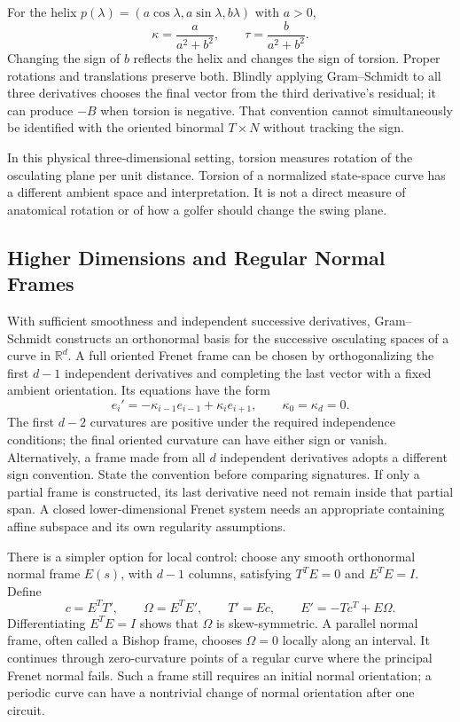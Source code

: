 For the helix $p(\lambda)=(a\cos\lambda,a\sin\lambda,b\lambda)$ with $a>0$,
\begin{equation}
 \kappa=\frac{a}{a^2+b^2},\qquad \tau=\frac{b}{a^2+b^2}.
\end{equation}
Changing the sign of $b$ reflects the helix and changes the sign of torsion.
Proper rotations and translations preserve both. Blindly applying
Gram--Schmidt to all three derivatives chooses the final vector from the
third derivative's residual; it can produce $-B$ when torsion is negative.
That convention cannot simultaneously be identified with the oriented
binormal $T\times N$ without tracking the sign.

In this physical three-dimensional setting, torsion measures rotation of the
osculating plane per unit distance. Torsion of a normalized state-space curve
has a different ambient space and interpretation. It is not a direct measure
of anatomical rotation or of how a golfer should change the swing plane.

\subsection{Higher Dimensions and Regular Normal Frames}

With sufficient smoothness and independent successive derivatives,
Gram--Schmidt constructs an orthonormal basis for the successive osculating
spaces of a curve in $\mathbb R^d$. A full oriented Frenet frame can be chosen
by orthogonalizing the first $d-1$ independent derivatives and completing the
last vector with a fixed ambient orientation. Its equations have the form
\begin{equation}
 e_i'=-\kappa_{i-1}e_{i-1}+\kappa_i e_{i+1},
 \qquad \kappa_0=\kappa_d=0.
\end{equation}
The first $d-2$ curvatures are positive under the required independence
conditions; the final oriented curvature can have either sign or vanish.
Alternatively, a frame made from all $d$ independent derivatives adopts a
different sign convention. State the convention before comparing signatures.
If only a partial frame is constructed, its last derivative need not remain
inside that partial span. A closed lower-dimensional Frenet system needs an
appropriate containing affine subspace and its own regularity assumptions.

There is a simpler option for local control: choose any smooth orthonormal
normal frame $E(s)$, with $d-1$ columns, satisfying
$T^TE=0$ and $E^TE=I$. Define
\begin{equation}
 c=E^TT',\qquad \Omega=E^TE',\qquad
 T'=Ec,\qquad E'=-Tc^T+E\Omega.
\end{equation}
Differentiating $E^TE=I$ shows that $\Omega$ is skew-symmetric. A parallel
normal frame, often called a Bishop frame, chooses $\Omega=0$ locally along
an interval. It continues through zero-curvature points of a regular curve
where the principal Frenet normal fails. Such a frame still requires an
initial normal orientation; a periodic curve can have a nontrivial change
of normal orientation after one circuit.

